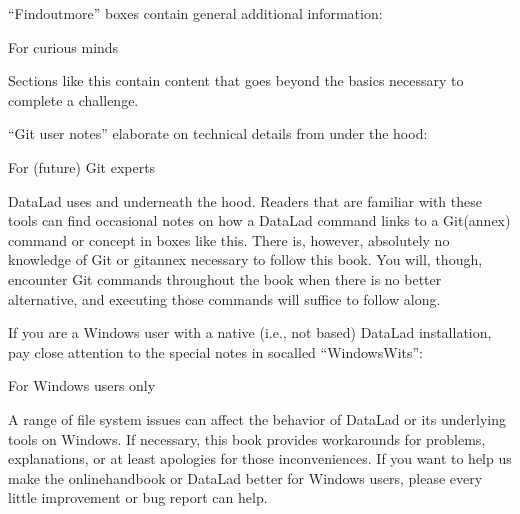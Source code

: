 \sphinxAtStartPar
“Find\sphinxhyphen{}out\sphinxhyphen{}more” boxes contain general additional information:
\begin{findoutmore}[label={fom-intro}, before title={\thetcbcounter\ }, check odd page=true]{For curious minds}
\label{\detokenize{intro/narrative:fom-intro}}

\sphinxAtStartPar
Sections like this contain content that goes beyond the basics
necessary to complete a challenge.


\end{findoutmore}

\sphinxAtStartPar
“Git user notes” elaborate on technical details from under the hood:
\begin{gitusernote}[before title={\thetcbcounter\ }, check odd page=true]{For (future) Git experts}

\sphinxAtStartPar
DataLad uses {\hyperref[\detokenize{glossary:term-Git}]{}} and {\hyperref[\detokenize{glossary:term-git-annex}]{}} underneath the hood. Readers that
are familiar with these tools can find occasional notes on how a DataLad   command links to a Git(\sphinxhyphen{}annex) command or concept in boxes like this.
There is, however, absolutely no knowledge of Git or git\sphinxhyphen{}annex necessary
to follow this book. You will, though, encounter Git commands throughout
the book when there is no better alternative, and executing those commands will
suffice to follow along.


\end{gitusernote}

\sphinxAtStartPar
If you are a Windows user with a native (i.e., not  based) DataLad installation, pay close attention to the special notes in so\sphinxhyphen{}called “Windows\sphinxhyphen{}Wits”:
\begin{windowswit}[before title={\thetcbcounter\ }, check odd page=true]{For Windows users only}

\sphinxAtStartPar
A range of file system issues can affect the behavior of DataLad or its underlying tools on Windows.
If necessary, this book provides workarounds for problems, explanations, or at least apologies for those inconveniences.
If you want to help us make the online\sphinxhyphen{}handbook or DataLad better for Windows users, please  \textendash{} every little improvement or bug report can help.


\end{windowswit}

